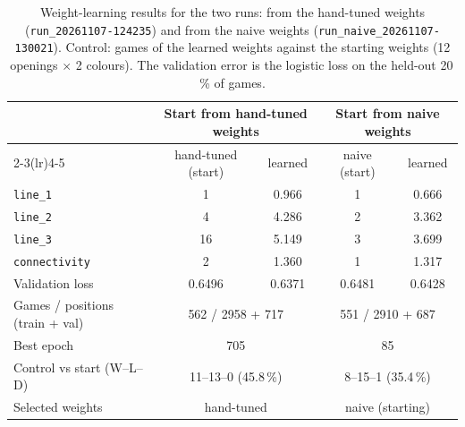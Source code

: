 \documentclass[a4paper,10pt,twocolumn]{article}
\newcommand{\code}[1]{\texttt{#1}}
\begin{document}
\begin{table}[t]
\centering
\caption{Weight-learning results for the two runs: from the hand-tuned weights (\code{run\_20261107-124235}) and from the naive weights (\code{run\_naive\_20261107-130021}). Control: games of the learned weights against the starting weights (12 openings $\times$ 2 colours). The validation error is the logistic loss on the held-out 20\,\% of games.}
\label{tab:learning}
\begin{tabular}{@{}lcccc@{}}
\toprule
& \multicolumn{2}{c}{Start from hand-tuned weights} & \multicolumn{2}{c}{Start from naive weights} \\
\cmidrule(lr){2-3}\cmidrule(lr){4-5}
& hand-tuned (start) & learned & naive (start) & learned \\
\midrule
\code{line\_1} & 1 & 0.966 & 1 & 0.666 \\
\code{line\_2} & 4 & 4.286 & 2 & 3.362 \\
\code{line\_3} & 16 & 5.149 & 3 & 3.699 \\
\code{connectivity} & 2 & 1.360 & 1 & 1.317 \\
\midrule
Validation loss & 0.6496 & 0.6371 & 0.6481 & 0.6428 \\
Games / positions (train + val) & \multicolumn{2}{c}{562 / 2958 + 717} & \multicolumn{2}{c}{551 / 2910 + 687} \\
Best epoch & \multicolumn{2}{c}{705} & \multicolumn{2}{c}{85} \\
Control vs start (W--L--D) & \multicolumn{2}{c}{11--13--0 (45.8\,\%)} & \multicolumn{2}{c}{8--15--1 (35.4\,\%)} \\
Selected weights & \multicolumn{2}{c}{hand-tuned} & \multicolumn{2}{c}{naive (starting)} \\
\bottomrule
\end{tabular}
\end{table}
\end{document}
